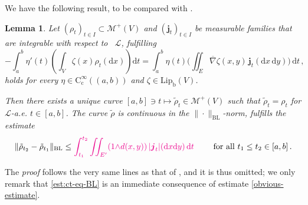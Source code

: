 \documentclass[11pt,reqno]{amsart}
\numberwithin{equation}{section}
\newcommand{\calM}{\mathcal{M}}
\newcommand{\scrL}{\mathscr{L}}
\newcommand{\Lip}{\mathrm{Lip}}
\newcommand{\dnabla}{\overline\nabla}
\newcommand{\dd}{\mathrm{d}}
\newtheorem{lemma}[theorem]{Lemma}
\theoremstyle{definition}
\def\dd{\mathrm{d}}
\newcommand{\edg}{E}
\newcommand{\Lebone}{\scrL}
\newcommand{\bj}{{\boldsymbol j}}
\newcommand{\nbl}[1]{\|#1\|_{\mathrm{BL}} }
\newcommand{\RCR}{\color{magenta}}
\newcommand{\RNEW}{\color{black}} %
\newcommand{\TODOBS}[1]{\todo[inline, color=red!40]{#1}}
\newcommand{\EEE}{\color{black}}
\numberwithin{equation}{section}
\begin{document}
We have the following result, to be compared with \cite[Lemma 4.4]{PRST22}. 
\begin{lemma}
\label{l:continuous-represent}
Let 
$(\rho_t)_{t\in I} \subset \calM^+(V)$ and $(\bj_t)_{t\in I}$ be measurable families
that are integrable with respect to ~$\Lebone$, fulfilling
  \begin{equation}
    -\int_a^b \eta'(t) \left( \int_V \zeta(x) \rho_t (\dd x ) \right) \dd
    t = \int_a^b \eta(t)\Big(\iint_\edg \dnabla\zeta(x,y)\,  \bj_t(\dd
    x\,\dd y)\Big)\,\dd t
    \,,\label{eq:90}
  \end{equation}
  holds for every $\eta \in
  \mathrm{C}_\mathrm{c}^\infty((a,b))$ and $\zeta \in \Lip_{\mathrm{b}}(V)$.
  \par
   Then there exists a unique curve $[a,b] \ni t
  \mapsto \tilde{\rho}_t \in \calM^+ (V)$ such that $\tilde{\rho}_t =
  \rho_t$ for $\Lebone$-a.e. $t\in [a,b]$. The curve $\tilde\rho$ is continuous in the $\nbl{\cdot}$-norm,  fulfills the estimate
  \begin{equation}
  \label{est:ct-eq-BL}	
    \nbl{\tilde \rho_{t_2}-\tilde \rho_{t_1}} \leq 
    \RCR
  \int_{t_1}^{t_2} \iint_{E'}  (1{\wedge}d(x,y)) \,  |\bj_t|(\dd x \dd y)\, \dd t  
  \EEE \qquad
  \text{ for  all }  t_1 \leq t_2 \in [a,b]\,. 
\end{equation}
\end{lemma}
\RNEW The \emph{proof} follows the very same lines as that of  \cite[Lemma 4.4]{PRST22}, and it is thus omitted; we only remark that 
\eqref{est:ct-eq-BL}	 is an immediate consequence of estimate \eqref{obvious-estimate}. \EEE






\end{document}
